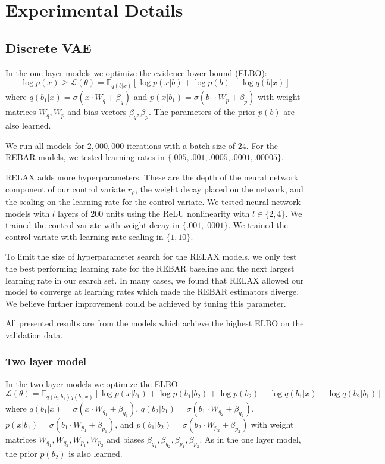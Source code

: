 \documentclass{article}
\newcommand{\E}{\mathbb{E}}
\begin{document}
\section{Experimental Details}
\label{experiment appendix}

\subsection{Discrete VAE}
\label{app_disc_vae}
In the one layer models we optimize the evidence lower bound (ELBO): $$\log p(x) \geq \mathcal{L}(\theta) = \E_{q(b|x)}[\log p(x|b) + \log p(b) - \log q(b|x)]$$ where $q(b_1|x) = \sigma(x\cdot W_q + \beta_q)$ and $p(x| b_1) = \sigma(b_1\cdot W_p + \beta_p)$ with weight matrices $W_q,W_p$ and bias vectors $\beta_q,\beta_p$.
The parameters of the prior $p(b)$ are also learned.

We run all models for $2,000,000$ iterations with a batch size of $24$. For the REBAR models, we tested learning rates in $\{.005, .001, .0005,  .0001, .00005\}$. 

RELAX adds more hyperparameters.
These are the depth of the neural network component of our control variate $r_\rho$, the weight decay placed on the network, and the scaling on the learning rate for the control variate.
We tested neural network models with $l$ layers of 200 units using the ReLU nonlinearity with $l \in \{2, 4\}$.
We trained the control variate with weight decay in $\{.001, .0001\}$. We trained the control variate with learning rate scaling in $\{1, 10\}$.

To limit the size of hyperparameter search for the RELAX models, we only test the best performing learning rate for the REBAR baseline and the next largest learning rate in our search set.
In many cases, we found that RELAX allowed our model to converge at learning rates which made the REBAR estimators diverge.
We believe further improvement could be achieved by tuning this parameter.

All presented results are from the models which achieve the highest ELBO on the validation data.

\subsubsection{Two layer model}
In the two layer models we optimize the ELBO $$\mathcal{L}(\theta) = \E_{q(b_2|b_1)q(b_1|x)}[\log p(x|b_1) + \log p(b_1|b_2) + \log p(b_2) - \log q(b_1|x) - \log q(b_2|b_1)]$$ where $q(b_1|x) = \sigma(x\cdot W_{q_1} + \beta_{q_1})$, $q(b_2|b_1) = \sigma(b_1\cdot W_{q_2} + \beta_{q_2})$, $p(x| b_1) = \sigma(b_1\cdot W_{p_1} + \beta_{p_1})$, and $p(b_1| b_2) = \sigma(b_2\cdot W_{p_2} + \beta_{p_2})$ with weight matrices $W_{q_1},W_{q_2},W_{p_1},W_{p_2}$ and biases $\beta_{q_1},\beta_{q_2},\beta_{p_1},\beta_{p_2}$. As in the one layer model, the prior $p(b_2)$ is also learned.
\end{document}
